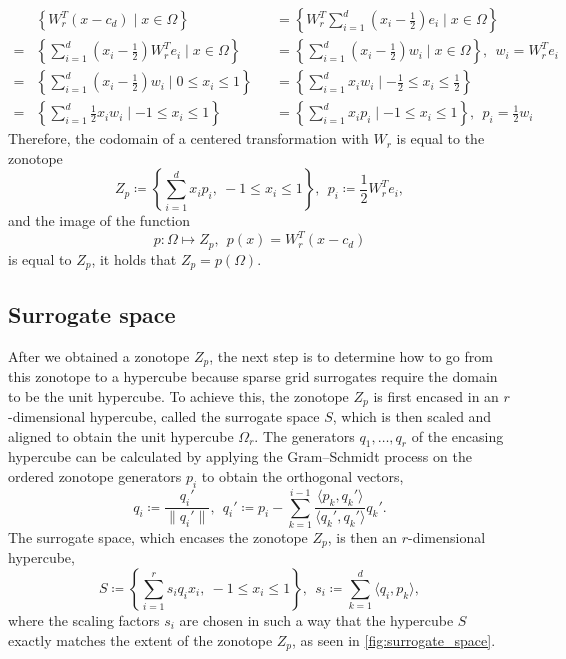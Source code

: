 \documentclass[
  a4paper,  %
  twoside,  %
  bibliography=totoc,
  headsepline,
  cleardoublepage=empty,
  parskip=half,
  draft=false
]{scrbook}
\begin{document}
\begin{equation}
\begin{alignedat}{2}
&\left\{W_r^T (x - c_d) \mid x \in \Omega\right\}&&=\left\{W_r^T \sum_{i=1}^d \left(x_i - \frac{1}{2}\right) e_i \mid x \in \Omega \right\}\\
=&\left\{\sum_{i=1}^d \left(x_i - \frac{1}{2}\right) W_r^T e_i \mid x \in \Omega \right\}&&=\left\{\sum_{i=1}^d \left(x_i - \frac{1}{2}\right) w_i \mid x \in \Omega \right\}, ~~ w_i=W_r^T e_i\\
=&\left\{\sum_{i=1}^d \left(x_i - \frac{1}{2}\right) w_i \mid 0 \leq x_i \leq 1 \right\}&&=\left\{\sum_{i=1}^d x_i w_i \mid -\frac{1}{2} \leq x_i \leq \frac{1}{2} \right\}\\
=&\left\{\sum_{i=1}^d \frac{1}{2} x_i w_i \mid -1 \leq x_i \leq 1 \right\}&&=\left\{\sum_{i=1}^d x_i p_i \mid -1 \leq x_i \leq 1 \right\}, ~~ p_i=\frac{1}{2} w_i
\label{zonotope_form}
\end{alignedat}
\end{equation}
%
Therefore, the codomain of a centered transformation with $W_r$ is equal to the zonotope
\begin{equation}
Z_{p} \coloneqq \left\{\sum_{i=1}^d x_i p_i , ~ -1 \leq x_i \leq 1\right\}, ~~ p_i \coloneqq \frac{1}{2} W_r^T e_i,
\end{equation}
and the image of the function
\begin{equation}
p \colon \Omega \mapsto Z_p, ~~ p(x)=W_r^T (x-c_d)
\end{equation}
is equal to $Z_p$, \ie it holds that $Z_{p}=p(\Omega)$.

\subsection{Surrogate space}

After we obtained a zonotope $Z_p$, the next step is to determine how to go from this zonotope to a hypercube because sparse grid surrogates require the domain to be the unit hypercube.
To achieve this, the zonotope $Z_p$ is first encased in an $r$-dimensional hypercube, called the surrogate space $S$, which is then scaled and aligned to obtain the unit hypercube $\Omega_r$.
The generators $q_1, \dots, q_r$ of the encasing hypercube can be calculated by applying the Gram–Schmidt process on the ordered zonotope generators $p_i$ to obtain the orthogonal vectors,
\begin{equation}
q_i \coloneqq \frac{q_i'}{\| q_i' \|},~~ q_i' \coloneqq p_i - \sum_{k=1}^{i-1} \frac{\langle p_k, q_k'\rangle}{\langle q_k', q_k' \rangle} q_k'.
\label{q}
\end{equation}
%
The surrogate space, which encases the zonotope $Z_p$, is then an $r$-dimensional hypercube,
\begin{equation}
S \coloneqq \left\{\sum_{i=1}^r s_i q_i x_i, ~ -1 \leq x_i \leq 1\right\},~~ s_i \coloneqq \sum_{k=1}^d \langle q_i, p_k\rangle,
\label{surrogate_space}
\end{equation}
where the scaling factors $s_i$ are chosen in such a way that the hypercube $S$ exactly matches the extent of the zonotope $Z_p$, as seen in \cref{fig:surrogate_space}.
\end{document}
